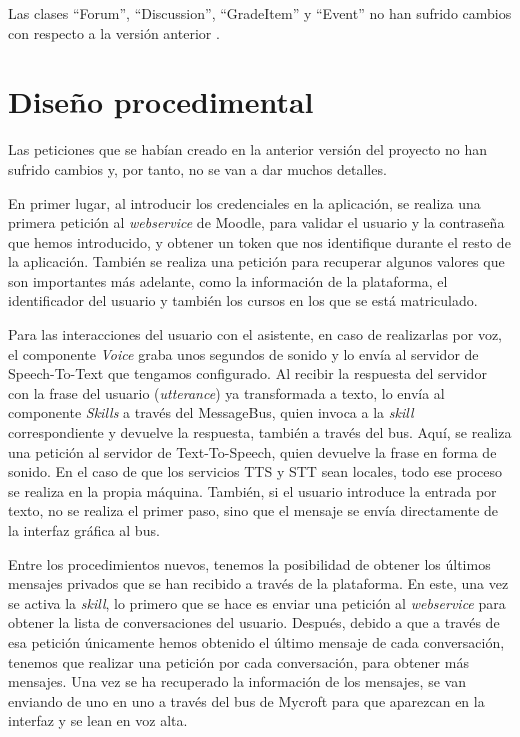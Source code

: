 Las clases ``Forum'', ``Discussion'', ``GradeItem'' y ``Event'' no han sufrido cambios con respecto a la versión anterior \cite{versionanterior}.

\section{Diseño procedimental}
Las peticiones que se habían creado en la anterior versión del proyecto \cite{versionanterior} no han sufrido cambios y, por tanto, no se van a dar muchos detalles.

En primer lugar, al introducir los credenciales en la aplicación, se realiza una primera petición al \textit{webservice} de Moodle, para validar el usuario y la contraseña que hemos introducido, y obtener un token que nos identifique durante el resto de la aplicación. También se realiza una petición para recuperar algunos valores que son importantes más adelante, como la información de la plataforma, el identificador del usuario y también los cursos en los que se está matriculado.

Para las interacciones del usuario con el asistente, en caso de realizarlas por voz, el componente \textit{Voice} graba unos segundos de sonido y lo envía al servidor de Speech-To-Text que tengamos configurado. Al recibir la respuesta del servidor con la frase del usuario (\textit{utterance}) ya transformada a texto, lo envía al componente \textit{Skills} a través del MessageBus, quien invoca a la \textit{skill} correspondiente y devuelve la respuesta, también a través del bus. Aquí, se realiza una petición al servidor de Text-To-Speech, quien devuelve la frase en forma de sonido. En el caso de que los servicios TTS y STT sean locales, todo ese proceso se realiza en la propia máquina. También, si el usuario introduce la entrada por texto, no se realiza el primer paso, sino que el mensaje se envía directamente de la interfaz gráfica al bus.

Entre los procedimientos nuevos, tenemos la posibilidad de obtener los últimos mensajes privados que se han recibido a través de la plataforma. En este, una vez se activa la \textit{skill}, lo primero que se hace es enviar una petición al \textit{webservice} para obtener la lista de conversaciones del usuario. Después, debido a que a través de esa petición únicamente hemos obtenido el último mensaje de cada conversación, tenemos que realizar una petición por cada conversación, para obtener más mensajes. Una vez se ha recuperado la información de los mensajes, se van enviando de uno en uno a través del bus de Mycroft para que aparezcan en la interfaz y se lean en voz alta.

